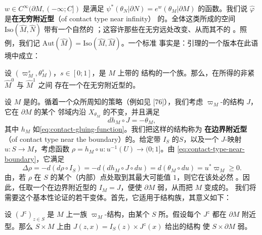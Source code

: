 $w\in C^\infty(\partial M,(-\infty;C])$ 是满足 $\psi^*(\theta_N|\partial N)=e^w(\theta_M|\partial M)$
的函数。我们说 $\widehat{\varphi}$ 是\textbf{在无穷附近\trContact{}型}（of contact type near infinity）
的。全体这类\trIsomorphism{}所成的空间 $\mathrm{Iso}(\widehat{M},\widehat{N})$ 带有一个自然的%
\trTopology；这容许那些在无穷远处改变\trContact\trDiffeomorphism、从而其\trSupport{}不\trCompact{}的%
\trIsotopy。照例，我们记 $\mathrm{Aut}(\widehat{M})=\mathrm{Iso}(\widehat{M},\widehat{M})$。一个标准
事实是：\trMoser{}引理的一个版本在此语境中成立：
\begin{lemma}\label{thm:contact-type-moser}
设 $(\varpi_M^s,\theta_M^s)$，$s\in[0;1]$，是 $M$ 上带\trContactTypeBoundary{}的\trExactSymplectic{}%
结构的一个\trSmooth{}族。那么，在所得的非紧\trManifold{}$\widehat{M}^0$ 与 $\widehat{M}^1$ 之间
存在一个在无穷附近\trContact{}型的\trExactSymplectic\trIsomorphism。
\noqed
\end{lemma}
设 $M$ 是\trContactTypeBoundary{}的\trExactSymplectic\trManifold。循着一个众所周知的策略（例如见
[76]），我们考虑 $\varpi_M$-\trCompatible{}的\trAlmostComplex{}结构 $J$，它在 $\partial M$ 的某个%
邻域内沿 $X_{\theta_M}$ 的\trFlow{}不变，并且满足
\begin{equation}\label{eq:contact-type-near-boundary}
dh_M\circ J=-\theta_M,
\end{equation}
其中 $h_M$ 如\eqref{eq:contact-gluing-function}。我们把这样的\trAlmostComplex{}结构称为%
\textbf{在边界附近\trContact{}型}（of contact type near the boundary）的。给定带%
\trComplexStructure{}$I_S$ 的\trRiemann\trSurface{}$S$，以及一个 $J$-\trHolomorphic{}映射
$u\colon S\to M$，考虑函数 $\rho=h_M\circ u\colon u^{-1}(U)\to(0;1]$。由
\eqref{eq:contact-type-near-boundary}，它满足
\begin{equation}\label{eq:rho-laplacian}
\Delta\rho=-d(d\rho\circ I_S)=-d(dh_M\circ J\circ du)=d(\theta_M\circ du)=u^*\varpi_M\ge 0.
\end{equation}
由\trMaximumPrinciple，若 $\rho$ 在 $S$ 的某个（内部）点处取到其最大可能值 $1$，则它在该处必然%
\trLocallyConstant。因此，任取一个在边界附近\trContact{}型的 $I_M=J$，便使 $\partial M$
弱\trConvex，从而把 $M$ 变成\trCorneredBoundary{}的\trExactSymplectic\trManifold。
我们将需要这个基本\trConvex{}性论证的若干变体。首先，它适用于\trAlmostComplex{}结构族，其意义如下：
\begin{lemma}\label{thm:family-convexity}
设 $(J^z)_{z\in S}$ 是 $M$ 上一族 $\varpi_M$-\trCompatible{}\trAlmostComplex{}结构，由某个%
\trRiemann\trSurface{}$S$ 所\trParametrization。假设每个 $J^z$ 都在 $\partial M$ 附近%
\trContact{}型。那么 $S\times M$ 上由 $J(z,x)=I_S(z)\times J^z(x)$ 给出的\trAlmostComplex{}结构
使 $S\times\partial M$ 弱\trConvex。
\noqed
\end{lemma}
